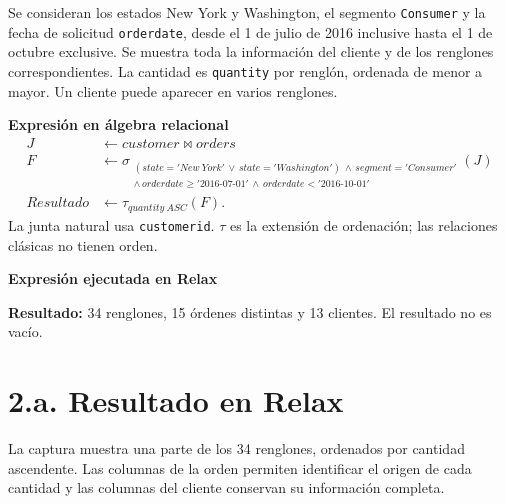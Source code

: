 Se consideran los estados New York y Washington, el segmento \texttt{Consumer} y la fecha de solicitud \texttt{orderdate}, desde el 1 de julio de 2016 inclusive hasta el 1 de octubre exclusive. Se muestra toda la información del cliente y de los renglones correspondientes. La cantidad es \texttt{quantity} por renglón, ordenada de menor a mayor. Un cliente puede aparecer en varios renglones.

\textbf{Expresión en álgebra relacional}
\begin{align*}
J &\leftarrow customer\bowtie orders\\
F &\leftarrow \sigma_{\substack{(state='New\ York'\,\lor\,state='Washington')\,\land\,segment='Consumer'\\\land\,orderdate\geq '2016\text{-}07\text{-}01'\,\land\,orderdate<'2016\text{-}10\text{-}01'}}(J)\\
Resultado &\leftarrow \tau_{quantity\ ASC}(F).
\end{align*}
La junta natural usa \texttt{customerid}. $\tau$ es la extensión de ordenación; las relaciones clásicas no tienen orden.

\textbf{Expresión ejecutada en Relax}

\textbf{Resultado:} 34 renglones, 15 órdenes distintas y 13 clientes. El resultado no es vacío.
\newpage
\section*{2.a. Resultado en Relax}
La captura muestra una parte de los 34 renglones, ordenados por cantidad ascendente. Las columnas de la orden permiten identificar el origen de cada cantidad y las columnas del cliente conservan su información completa.
